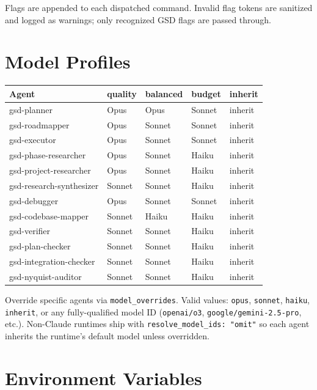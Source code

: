 \documentclass[10pt,letterpaper]{article}
\begin{document}
Flags are appended to each dispatched command. Invalid flag tokens are sanitized and logged as warnings; only recognized GSD flags are passed through.

\section{Model Profiles}

\begin{longtable}{@{}l l l l l@{}}
\toprule
\textbf{\footnotesize Agent} & \textbf{\footnotesize quality} & \textbf{\footnotesize balanced} & \textbf{\footnotesize budget} & \textbf{\footnotesize inherit} \\
\midrule
\endhead
gsd-planner & Opus & Opus & Sonnet & inherit \\
gsd-roadmapper & Opus & Sonnet & Sonnet & inherit \\
gsd-executor & Opus & Sonnet & Sonnet & inherit \\
gsd-phase-researcher & Opus & Sonnet & Haiku & inherit \\
gsd-project-researcher & Opus & Sonnet & Haiku & inherit \\
gsd-research-synthesizer & Sonnet & Sonnet & Haiku & inherit \\
gsd-debugger & Opus & Sonnet & Sonnet & inherit \\
gsd-codebase-mapper & Sonnet & Haiku & Haiku & inherit \\
gsd-verifier & Sonnet & Sonnet & Haiku & inherit \\
gsd-plan-checker & Sonnet & Sonnet & Haiku & inherit \\
gsd-integration-checker & Sonnet & Sonnet & Haiku & inherit \\
gsd-nyquist-auditor & Sonnet & Sonnet & Haiku & inherit \\
\bottomrule
\end{longtable}

Override specific agents via \texttt{model\_overrides}. Valid values: \texttt{opus}, \texttt{sonnet}, \texttt{haiku}, \texttt{inherit}, or any fully-qualified model ID (\texttt{openai/o3}, \texttt{google/gemini-2.5-pro}, etc.). Non-Claude runtimes ship with \texttt{resolve\_model\_ids: "omit"} so each agent inherits the runtime's default model unless overridden.

\section{Environment Variables}
\end{document}
